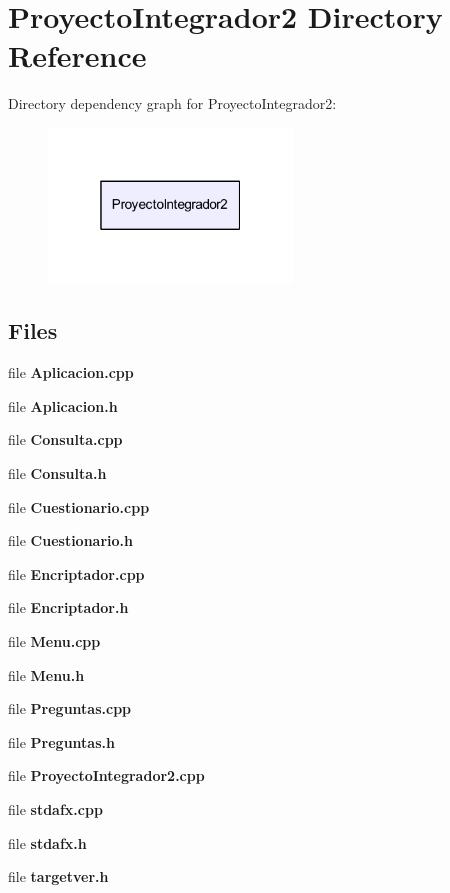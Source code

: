 \section{Proyecto\-Integrador2 Directory Reference}
\label{dir_dd295ae4e78f04c695809609e0076f06}
Directory dependency graph for Proyecto\-Integrador2\-:\nopagebreak
\begin{figure}[H]
\begin{center}
\leavevmode
\includegraphics[width=184pt]{dir_dd295ae4e78f04c695809609e0076f06_dep}
\end{center}
\end{figure}
\subsection*{Files}
\begin{DoxyCompactItemize}
\item 
file {\bf Aplicacion.\-cpp}
\item 
file {\bf Aplicacion.\-h}
\item 
file {\bf Consulta.\-cpp}
\item 
file {\bf Consulta.\-h}
\item 
file {\bf Cuestionario.\-cpp}
\item 
file {\bf Cuestionario.\-h}
\item 
file {\bf Encriptador.\-cpp}
\item 
file {\bf Encriptador.\-h}
\item 
file {\bf Menu.\-cpp}
\item 
file {\bf Menu.\-h}
\item 
file {\bf Preguntas.\-cpp}
\item 
file {\bf Preguntas.\-h}
\item 
file {\bf Proyecto\-Integrador2.\-cpp}
\item 
file {\bf stdafx.\-cpp}
\item 
file {\bf stdafx.\-h}
\item 
file {\bf targetver.\-h}
\end{DoxyCompactItemize}
